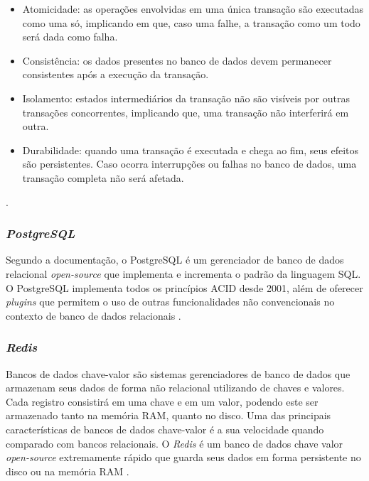 \begin{itemize}
    \item Atomicidade: as operações envolvidas em uma única transação são executadas como uma só, implicando em que, caso uma falhe, a transação como um todo será dada como falha.
    \item Consistência: os dados presentes no banco de dados devem permanecer consistentes após a execução da transação.
    \item Isolamento: estados intermediários da transação não são visíveis por outras transações concorrentes, implicando que, uma transação não interferirá em outra.
    \item Durabilidade: quando uma transação é executada e chega ao fim, seus efeitos são persistentes. Caso ocorra interrupções ou falhas no banco de dados, uma transação completa não será afetada.
\end{itemize}

\cite{yu2009acid}.

\subsubsection{\textit{PostgreSQL}}

Segundo a documentação, o PostgreSQL é um gerenciador de banco de dados relacional \textit{open-source} que implementa e incrementa o padrão da linguagem SQL. O PostgreSQL implementa todos os princípios ACID desde 2001, além de oferecer \textit{plugins} que permitem o uso de outras funcionalidades não convencionais no contexto de banco de dados relacionais \cite{postgresql_about}.

\subsubsection{\textit{Redis}}

Bancos de dados chave-valor são sistemas gerenciadores de banco de dados que armazenam seus dados de forma não relacional utilizando de chaves e valores. Cada registro consistirá em uma chave e em um valor, podendo este ser armazenado tanto na memória RAM, quanto no disco. Uma das principais características de bancos de dados chave-valor é a sua velocidade quando comparado com bancos relacionais. O \textit{Redis} é um banco de dados chave valor \textit{open-source} extremamente rápido que guarda seus dados em forma persistente no disco ou na memória RAM \cite{redis-in-action}.

